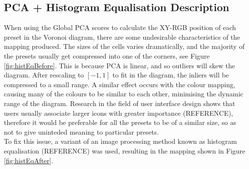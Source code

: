 \documentclass[11pt, oneside]{report}   	%
\begin{document}
\subsection{PCA + Histogram Equalisation Description}
When using the Global PCA scores to calculate the XY-RGB position of each preset in the Voronoi diagram, there are some undesirable characteristics of the mapping produced. The sizes of the cells varies dramatically, and the majority of the presets usually get compressed into one of the corners, see Figure \ref{fig:histEqBefore}. This is because PCA is linear, and so outliers will skew the diagram. After rescaling to $[-1, 1]$ to fit in the diagram, the inliers will be compressed to a small range. A similar effect occurs with the colour mapping, causing many of the colours to be similar to each other, minimising the dynamic range of the diagram. Research in the field of user interface design shows that users usually associate larger icons with greater importance (REFERENCE), therefore it would be preferable for all the presets to be of a similar size, so as not to give uninteded meaning to particular presets.\\
To fix this issue, a variant of an image processing method known as histogram equalisation (REFERENCE) was used, resulting in the mapping shown in Figure \ref{fig:histEqAfter}.
\end{document}
